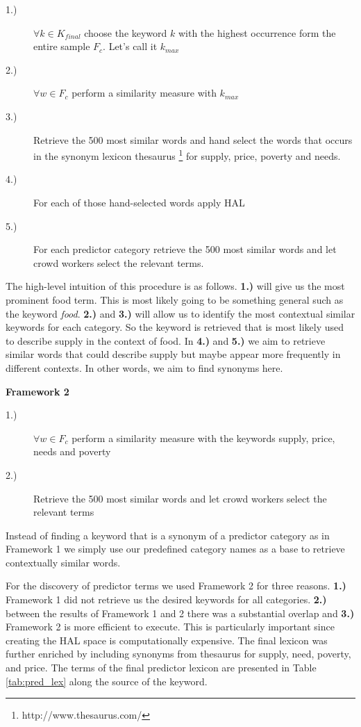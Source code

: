 \begin{description}
  \item[1.)] $\forall k \in K_{final}$ choose the keyword $k$ with the highest occurrence form the entire sample $F_c$. Let's call it $k_{max}$  
  \item[2.)] $\forall w \in F_c $ perform a similarity measure with $k_{max}$
  \item[3.)] Retrieve the 500 most similar words and hand select the words that occurs in the synonym lexicon thesaurus \footnote{http://www.thesaurus.com/} for supply, price, poverty and needs. 
    \item[4.)] For each of those hand-selected words  apply HAL 
  \item[5.)] For each predictor category retrieve the 500 most similar words and let crowd workers select the relevant terms. 
    \end{description}

The high-level intuition of this procedure is as follows. \textbf{1.)} will give us the most prominent food term. This is most likely going to be something general such as the keyword \emph{food}. \textbf{2.)} and \textbf{3.)} will allow us to identify the most contextual similar keywords for each category. So the keyword is retrieved that is most likely used to describe supply in the context of food. In \textbf{4.)} and \textbf{5.)} we aim to retrieve similar words that could describe supply but maybe appear more frequently in different contexts. In other words, we aim to find synonyms here.   


\textbf{Framework 2}


\begin{description}
   \item[1.)] $\forall w \in F_c $ perform a similarity measure with the keywords supply, price, needs and poverty
  \item[2.)]  Retrieve the 500 most similar words and let crowd workers select the relevant terms  
  \end{description}

Instead of finding a keyword that is a synonym of a predictor category as in Framework 1 we simply use our predefined category names as a base to retrieve contextually similar words. 

For the discovery of predictor terms we used Framework 2 for three reasons. \textbf{1.)}  Framework 1 did not retrieve us the desired keywords for all categories. \textbf{2.)} between the results of Framework 1 and 2 there was a substantial overlap and \textbf{3.)}  Framework 2 is more efficient to execute. This is particularly important since creating the HAL space is computationally expensive. The final lexicon was further enriched by including synonyms from thesaurus  for supply, need, poverty, and price. The terms of the final predictor lexicon are presented in Table \ref{tab:pred_lex} along the source of the keyword. 


